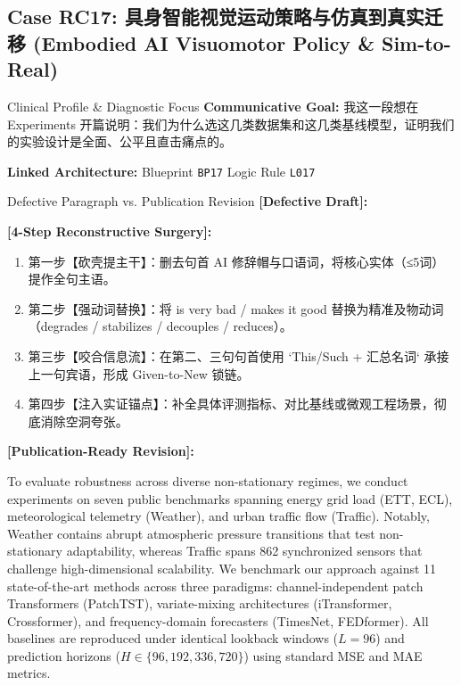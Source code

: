 \subsection{Case RC17: 具身智能视觉运动策略与仿真到真实迁移 (Embodied AI Visuomotor Policy \& Sim-to-Real)}\label{case:RC17}
\begin{ConceptBox}{Clinical Profile \& Diagnostic Focus}
\textbf{Communicative Goal:} 我这一段想在 Experiments 开篇说明：我们为什么选这几类数据集和这几类基线模型，证明我们的实验设计是全面、公平且直击痛点的。\par
\textbf{Linked Architecture:} Blueprint \texttt{BP17} \enspace\textbar\enspace Logic Rule \texttt{L017}
\end{ConceptBox}
\begin{ExampleBox}{Defective Paragraph vs. Publication Revision}
\textbf{\color{TargetHighlight}[Defective Draft]:}\par
{}\par\vspace{6pt}
\textbf{\color{AcadForest}[4-Step Reconstructive Surgery]:}
\begin{enumerate}[label=\textbf{\color{AcadNavy}Step \arabic*:}, leftmargin=2em]
  \item 第一步【砍壳提主干】：删去句首 AI 修辞帽与口语词，将核心实体（≤5词）提作全句主语。
  \item 第二步【强动词替换】：将 is very bad / makes it good 替换为精准及物动词（degrades / stabilizes / decouples / reduces）。
  \item 第三步【咬合信息流】：在第二、三句句首使用 `This/Such + 汇总名词` 承接上一句宾语，形成 Given-to-New 锁链。
  \item 第四步【注入实证锚点】：补全具体评测指标、对比基线或微观工程场景，彻底消除空洞夸张。
\end{enumerate}\vspace{4pt}
\textbf{\color{AcadNavy}[Publication-Ready Revision]:}\par
To evaluate robustness across diverse non-stationary regimes, we conduct experiments on seven public benchmarks spanning energy grid load (ETT, ECL), meteorological telemetry (Weather), and urban traffic flow (Traffic). Notably, Weather contains abrupt atmospheric pressure transitions that test non-stationary adaptability, whereas Traffic spans 862 synchronized sensors that challenge high-dimensional scalability. We benchmark our approach against 11 state-of-the-art methods across three paradigms: channel-independent patch Transformers (PatchTST), variate-mixing architectures (iTransformer, Crossformer), and frequency-domain forecasters (TimesNet, FEDformer). All baselines are reproduced under identical lookback windows ($L=96$) and prediction horizons ($H \in \{96, 192, 336, 720\}$) using standard MSE and MAE metrics.
\end{ExampleBox}
